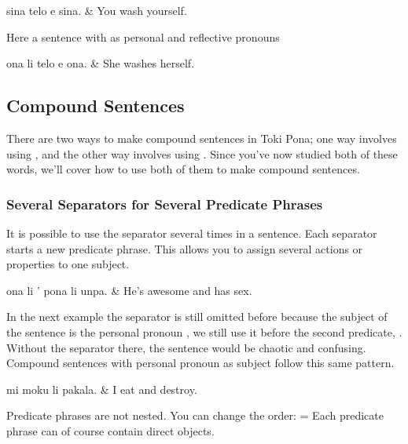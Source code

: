 \begin{translationtable}
    sina telo e sina. & You wash yourself. \\
\end{translationtable}
%
Here a sentence with  as personal and reflective pronouns

\begin{translationtable}
    ona li telo e ona. & She washes herself. \\
\end{translationtable}
%
\subsection*{Compound Sentences}
There are two ways to make compound sentences in Toki Pona; one way involves using , and the other way involves using .
Since you've now studied both of these words, we'll cover how to use both of them to make compound sentences.

\subsubsection*{Several  Separators for Several Predicate Phrases}
\label{sssec:multiple_li}
It is possible to use the separator  several times in a sentence.
Each separator  starts a new predicate phrase.
This allows you to assign several actions or properties to one subject.

\begin{translationtable}
    ona li ' pona li unpa. & He's awesome and has sex. \\
\end{translationtable}
%
In the next example the separator  is still omitted before  because the subject of the sentence is the personal pronoun , we still use it before the second predicate, .
Without the separator  there, the sentence would be chaotic and confusing.
Compound sentences with personal pronoun  as subject follow this same pattern.

\begin{translationtable}
    mi moku li pakala. & I eat and destroy. \\
\end{translationtable}
%
Predicate phrases are not nested. You can change the order:
 = 
Each predicate phrase can of course contain direct objects.

